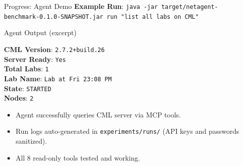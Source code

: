 \documentclass[11pt,aspectratio=169]{beamer}
\begin{document}
\begin{frame}{Progress: Agent Demo}
  \textbf{Example Run}: \texttt{java -jar target/netagent-benchmark-0.1.0-SNAPSHOT.jar run "list all labs on CML"}

  \vspace{6pt}
  \begin{block}{Agent Output (excerpt)}
    \small
    \begin{tabbing}
      \textbf{CML Version}: \= \texttt{2.7.2+build.26} \\
      \textbf{Server Ready}: \> \texttt{Yes} \\
      \textbf{Total Labs}: \> \texttt{1} \\
      \textbf{Lab Name}: \> \texttt{Lab at Fri 23:08 PM} \\
      \textbf{State}: \> \texttt{STARTED} \\
      \textbf{Nodes}: \> \texttt{2} \\
    \end{tabbing}
  \end{block}

  \vspace{6pt}
  \begin{itemize}
    \item Agent successfully queries CML server via MCP tools.
    \item Run logs auto-generated in \texttt{experiments/runs/}
          (API keys and passwords sanitized).
    \item All 8 read-only tools tested and working.
  \end{itemize}
\end{frame}
\end{document}
